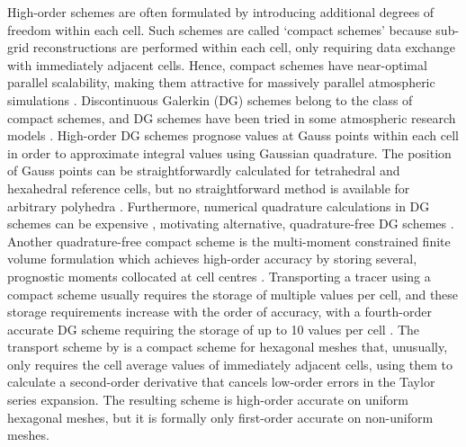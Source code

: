 High-order schemes are often formulated by introducing additional degrees of freedom within each cell.
Such schemes are called `compact schemes' because sub-grid reconstructions are performed within each cell, only requiring data exchange with immediately adjacent cells.
Hence, compact schemes have near-optimal parallel scalability, making them attractive for massively parallel atmospheric simulations \citep{ullrich2014}.
Discontinuous Galerkin (DG) schemes belong to the class of compact schemes, and DG schemes have been tried in some atmospheric research models \citep{nair2005,giraldo-restelli2008}.
High-order DG schemes prognose values at Gauss points within each cell in order to approximate integral values using Gaussian quadrature.
The position of Gauss points can be straightforwardly calculated for tetrahedral and hexahedral reference cells, but no straightforward method is available for arbitrary polyhedra \citep{costa2017}.
Furthermore, numerical quadrature calculations in DG schemes can be expensive \citep{dumbser2007}, motivating alternative, quadrature-free DG schemes \citep{atkins-shu1998,nair2015}.
Another quadrature-free compact scheme is the multi-moment constrained finite volume formulation which achieves high-order accuracy by storing several, prognostic moments collocated at cell centres \citep{ii-xiao2009}.
Transporting a tracer using a compact scheme usually requires the storage of multiple values per cell, and these storage requirements increase with the order of accuracy, with a fourth-order accurate DG scheme requiring the storage of up to 10 values per cell \citep{ullrich2010}.
The transport scheme by \citet{skamarock-gassmann2011} is a compact scheme for hexagonal meshes that, unusually, only requires the cell average values of immediately adjacent cells, using them to calculate a second-order derivative that cancels low-order errors in the Taylor series expansion.
The resulting scheme is high-order accurate on uniform hexagonal meshes, but it is formally only first-order accurate on non-uniform meshes.

